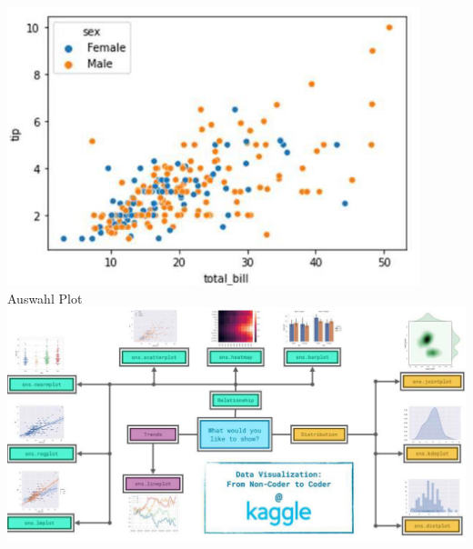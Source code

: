 \includegraphics[width=\linewidth]{img/scatterplot.png}
\textcolor{myblue}{Auswahl Plot}\\
\includegraphics[width=\linewidth]{img/which_plot.png}